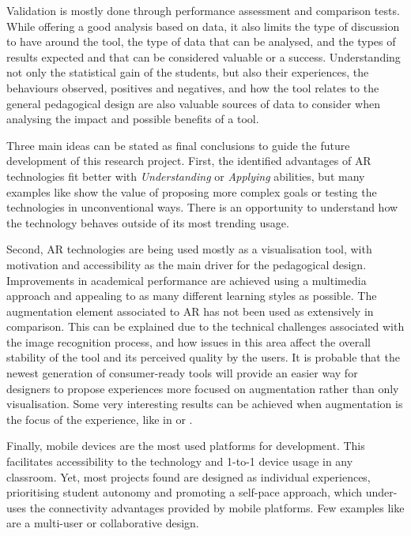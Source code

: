 Validation is mostly done through performance assessment and comparison tests. While offering a good analysis based on data, it also limits the type of discussion to have around the tool,
the type of data that can be analysed, and the types of results expected and that can be considered valuable or a success. Understanding not only the statistical gain of the students, but
also their experiences, the behaviours observed, positives and negatives, and how the tool relates to the general pedagogical design are also valuable sources of data to consider when
analysing the impact and possible benefits of a tool.

Three main ideas can be stated as final conclusions to guide the future development of this research project. First, the identified advantages of \ac{AR} technologies fit better with
\emph{Understanding} or \emph{Applying} abilities, but many examples like \textcite{lee_2021,hsu_2019} show the value of proposing more complex goals or testing the technologies in
unconventional ways. There is an opportunity to understand how the technology behaves outside of its most trending usage.

Second, \ac{AR} technologies are being used mostly as a visualisation tool, with motivation and accessibility as the main driver for the pedagogical design. Improvements in academical
performance are achieved using a multimedia approach and appealing to as many different learning styles as possible. The augmentation element associated to \ac{AR} has not been used as
extensively in comparison. This can be explained due to the technical challenges associated with the image recognition process, and how issues in this area affect the overall stability of
the tool and its perceived quality by the users. It is probable that the newest generation of consumer-ready tools will provide an easier way for designers to propose experiences more
focused on augmentation rather than only visualisation. Some very interesting results can be achieved when augmentation is the focus of the experience, like in \textcite{lim_2020} or
\textcite{schaper_2018}.

Finally, mobile devices are the most used platforms for development. This facilitates accessibility to the technology and 1-to-1 device usage in any classroom. Yet, most projects found are
designed as individual experiences, prioritising student autonomy and promoting a self-pace approach, which under-uses the connectivity advantages provided by mobile platforms. Few
examples like \textcite{cheng_2019,kim_2017} are a multi-user or collaborative design.


